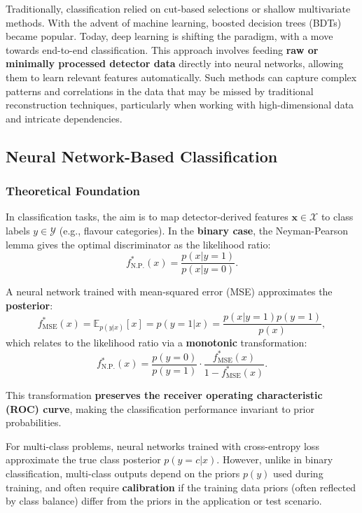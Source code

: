 \documentclass[11pt]{article}
\begin{document}
Traditionally, classification relied on cut-based selections or shallow multivariate methods. With the advent of machine learning, boosted decision trees (BDTs) became popular. Today, deep learning is shifting the paradigm, with a move towards end-to-end classification. This approach involves feeding \textbf{raw or minimally processed detector data} directly into neural networks, allowing them to learn relevant features automatically. Such methods can capture complex patterns and correlations in the data that may be missed by traditional reconstruction techniques, particularly when working with high-dimensional data and intricate dependencies.


\subsection{Neural Network-Based Classification}

\subsubsection{Theoretical Foundation \cite{rpp2023-machine-learning}}

In classification tasks, the aim is to map detector-derived features \( \mathbf{x} \in \mathcal{X} \) to class labels \( y \in \mathcal{Y} \) (e.g., flavour categories). In the \textbf{binary case}, the Neyman-Pearson lemma gives the optimal discriminator as the likelihood ratio:
\[
    f^*_{\text{N.P.}}(x) = \frac{p(x|y=1)}{p(x|y=0)}.
\]

A neural network trained with mean-squared error (MSE) approximates the \textbf{posterior}:
\[
    f^*_{\text{MSE}}(x) = \mathbb{E}_{p(y|x)}[x] = p(y=1|x) = \frac{p(x|y=1)p(y=1)}{p(x)},
\]
which relates to the likelihood ratio via a \textbf{monotonic} transformation:
\[
    f^*_{\text{N.P.}}(x) = \frac{p(y=0)}{p(y=1)} \cdot \frac{f^*_{\text{MSE}}(x)}{1 - f^*_{\text{MSE}}(x)}.
\]

This transformation \textbf{preserves the receiver operating characteristic (ROC) curve}, making the classification performance invariant to prior probabilities. 

For multi-class problems, neural networks trained with cross-entropy loss approximate the true class posterior \( p(y=c|x) \). However, unlike in binary classification, multi-class outputs depend on the priors \( p(y) \) used during training, and often require \textbf{calibration} if the training data priors (often reflected by class balance) differ from the priors in the application or test scenario.
\end{document}
